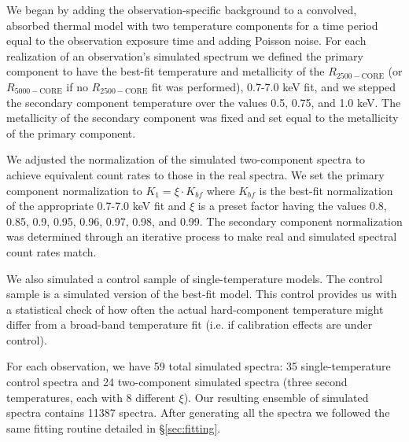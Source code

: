 \documentclass{emulateapj}
\newcommand{\rtwf}{$R_{2500-\text{CORE}}$ }
\newcommand{\rfif}{$R_{5000-\text{CORE}}$ }
\begin{document}
We began by adding the observation-specific background to a convolved,
absorbed thermal model with two temperature components for a time
period equal to the observation exposure time and adding Poisson
noise. For each realization of an observation's simulated spectrum we
defined the primary component to have the best-fit temperature and
metallicity of the \rtwf (or \rfif if no \rtwf fit was performed),
0.7-7.0 keV fit, and we stepped the secondary component temperature
over the values 0.5, 0.75, and 1.0 keV. The metallicity of the
secondary component was fixed and set equal to the metallicity of the
primary component.

We adjusted the normalization of the simulated two-component spectra to
achieve equivalent count rates to those in the real spectra. We set
the primary component normalization to $K_1 = \xi \cdot K_{bf}$ where
$K_{bf}$ is the best-fit normalization of the appropriate
0.7-7.0 keV fit and $\xi$ is a preset factor having the values 0.8,
0.85, 0.9, 0.95, 0.96, 0.97, 0.98, and 0.99. The secondary component
normalization was determined through an iterative process to make real
and simulated spectral count rates match.

We also simulated a control sample of single-temperature models. The
control sample is a simulated version of the best-fit model. This
control provides us with a statistical check of how often the actual
hard-component temperature might differ from a broad-band temperature
fit (i.e. if calibration effects are under control).

For each observation, we have 59 total simulated spectra: 35
single-temperature control spectra and 24 two-component simulated
spectra (three second temperatures, each with 8 different $\xi$). Our
resulting ensemble of simulated spectra contains 11387 spectra. After
generating all the spectra we followed the same fitting routine detailed
in \S\ref{sec:fitting}.
\end{document}
